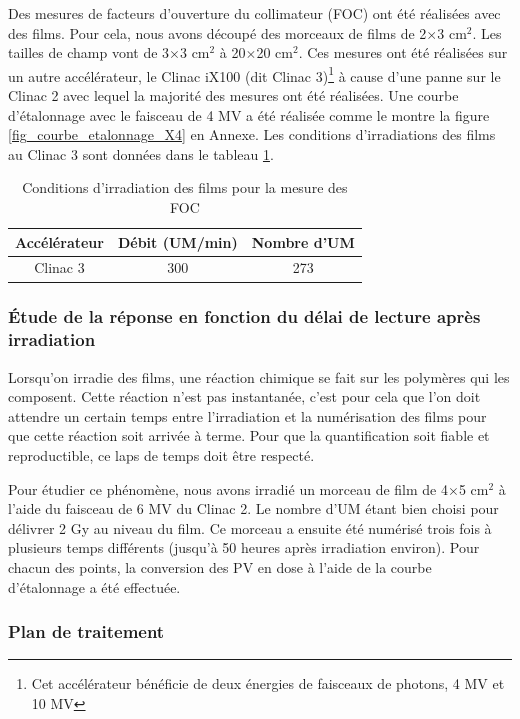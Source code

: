 \documentclass{book}
\begin{document}
Des mesures de facteurs d'ouverture du collimateur (FOC) ont été réalisées avec des films. Pour cela, nous avons découpé des morceaux de films de 2$\times$3 cm$^2$. Les tailles de champ vont de 3$\times$3 cm$^2$ à 20$\times$20 cm$^2$. Ces mesures ont été réalisées sur un autre accélérateur, le Clinac iX100 (dit Clinac 3)\footnote{Cet accélérateur bénéficie de deux énergies de faisceaux de photons, 4 MV et 10 MV} à cause d'une panne sur le Clinac 2 avec lequel la majorité des mesures ont été réalisées. Une courbe d'étalonnage avec le faisceau de 4 MV a été réalisée comme le montre la figure \ref*{fig_courbe_etalonnage_X4} en Annexe. Les conditions d'irradiations des films au Clinac 3 sont données dans le tableau \ref*{table_conditions_films_FOC}.

\begin{table}[h]
  \centering
  \begin{tabular}{ccc}
    \toprule
    \textbf{Accélérateur} & \textbf{Débit (UM/min)} & \textbf{Nombre d'UM} \\
    \toprule
    Clinac 3 & 300 & 273 \\
    \bottomrule
  \end{tabular}
  \caption{Conditions d'irradiation des films pour la mesure des FOC}
  \label{table_conditions_films_FOC}
\end{table}

\subsubsection{Étude de la réponse en fonction du délai de lecture après irradiation}

Lorsqu'on irradie des films, une réaction chimique se fait sur les polymères qui les composent. Cette réaction n'est pas instantanée, c'est pour cela que l'on doit attendre un certain temps entre l'irradiation et la numérisation des films pour que cette réaction soit arrivée à terme. Pour que la quantification soit fiable et reproductible, ce laps de temps doit être respecté.

Pour étudier ce phénomène, nous avons irradié un morceau de film de 4$\times$5 cm$^2$ à l'aide du faisceau de 6 MV du Clinac 2. Le nombre d'UM étant bien choisi pour délivrer 2 Gy au niveau du film. Ce morceau a ensuite été numérisé trois fois à plusieurs temps différents (jusqu'à 50 heures après irradiation environ). Pour chacun des points, la conversion des PV en dose à l'aide de la courbe d'étalonnage a été effectuée. 

\subsubsection{Plan de traitement}
\end{document}
